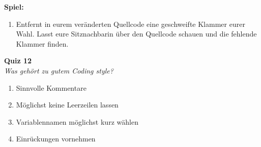 
\textbf{Spiel:}
\begin{enumerate}
    \item Entfernt in eurem veränderten Quellcode eine geschweifte Klammer
        eurer Wahl. Lasst eure Sitznachbarin über den Quellcode schauen und die
        fehlende Klammer finden.
\end{enumerate}

\textbf{Quiz 12}\\
\textit{Was gehört zu gutem Coding style?}
\begin{enumerate}[label=\alph]
    \item Sinnvolle Kommentare
    \item Möglichst keine Leerzeilen lassen
    \item Variablennamen möglichst kurz wählen
    \item Einrückungen vornehmen
\end{enumerate}
